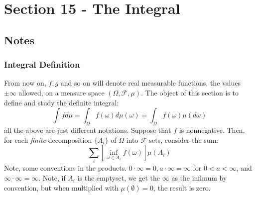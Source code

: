 \documentclass[12pt,a4paper]{article}
\newcommand{\1}[1]{\mathbbm{1}\left\{ #1 \right\}}
\newcommand{\fcal}{\mathcal{F}}
\begin{document}
\section{Section 15 - The Integral}
\subsection{Notes}
\subsubsection{Integral Definition} From now on, $f,g$ and so on will denote real measurable functions, the values $\pm \infty$ allowed, on a measure space $(\Omega, \fcal, \mu)$. The object of this section is to define and study the definite integral:
$$
	\int f d\mu = \int_\Omega f(\omega) d\mu(\omega) =
	\int_\Omega f(\omega) \mu(d\omega)
$$
all the above are just different notations. Suppose that $f$ is nonnegative. Then, for each \textit{finite} decomposition $\{A_i\}$ of $\Omega$ into $\fcal$ sets, consider the sum:
$$
	\sum_i\left[\inf_{\omega \in A_i} f(\omega)\right]\mu(A_i)
$$
Note, some conventions in the products. $0 \cdot \infty = 0, a \cdot \infty = \infty$ for $0 < a < \infty$, and $\infty \cdot \infty = \infty$. Note, if $A_i$ is the emptyset, we get the $\infty$ as the infimum by convention, but when multiplied with $\mu(\emptyset) = 0$, the result is zero.
\end{document}
